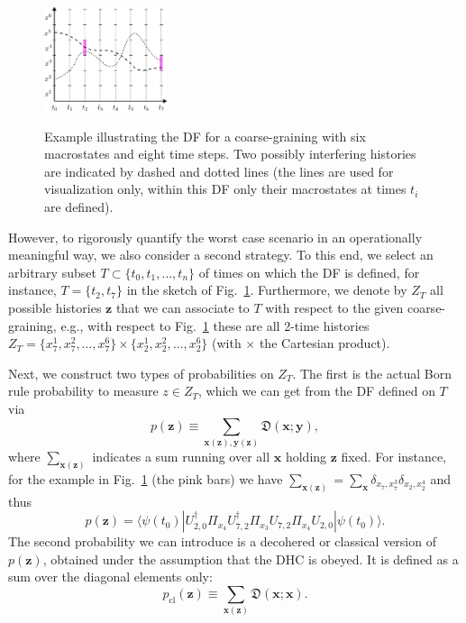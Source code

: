 \documentclass[pre,onecolumn,12pt,aps,longbibliography,nofootinbib]{revtex4-2}
\newcommand{\bb}[1]{\textbf{#1}}
\newcommand{\mf}[1]{{\mathfrak{#1}}}
\newcommand{\lr}[1]{{\langle {#1}\rangle}}
\begin{document}
\begin{figure}[t]
 \centering\includegraphics[width=0.32\textwidth,clip=true]{paths_v2.pdf}
 \label{fig paths}
 \caption{Example illustrating the DF for a coarse-graining with six macrostates and eight time steps. Two possibly interfering histories are indicated by dashed and dotted lines (the lines are used for visualization only, within this DF only their macrostates at times $t_i$ are defined). }
\end{figure}

However, to rigorously quantify the worst case scenario in an operationally meaningful way, we also consider a second strategy. To this end, we select an arbitrary subset $T\subset\{t_0,t_1,\dots,t_n\}$ of times on which the DF is defined, for instance, $T = \{t_2,t_7\}$ in the sketch of Fig.~\ref{fig paths}. Furthermore, we denote by $Z_T$ all possible histories $\bb z$ that we can associate to $T$ with respect to the given coarse-graining, e.g., with respect to Fig.~\ref{fig paths} these are all 2-time histories $Z_T = \{x^1_7,x^2_7,\dots,x^6_7\} \times \{x^1_2,x^2_2,\dots,x^6_2\}$ (with $\times$ the Cartesian product).

Next, we construct two types of probabilities on $Z_T$. The first is the actual Born rule probability to measure $z\in Z_T$, which we can get from the DF defined on $T$ via
\begin{equation}\label{eq prob quantum}
 p(\bb z) \equiv \sum_{\bb x(\bb z),\bb y(\bb z)} \mf{D}(\bb x;\bb y),
\end{equation}
where $\sum_{\bb x(\bb z)}$ indicates a sum running over all $\bb x$ holding $\bb z$ fixed. For instance, for the example in Fig.~\ref{fig paths} (the pink bars) we have $\sum_{\bb x(\bb z)} = \sum_{\bb x} \delta_{x_7,x^3_7} \delta_{x_2,x_2^4}$ and thus
\begin{equation}
 p(\bb z) = \lr{\psi(t_0)|U^\dagger_{2,0}\Pi_{x_4}U^\dagger_{7,2}\Pi_{x_3}U_{7,2}\Pi_{x_4}U_{2,0}|\psi(t_0)}.
\end{equation}
The second probability we can introduce is a decohered or classical version of $p(\bb z)$, obtained under the assumption that the DHC is obeyed. It is defined as a sum over the diagonal elements only:
\begin{equation}\label{eq prob classical}
 p_\text{cl}(\bb z) \equiv \sum_{\bb x(\bb z)} \mf{D}(\bb x;\bb x).
\end{equation}
\end{document}
